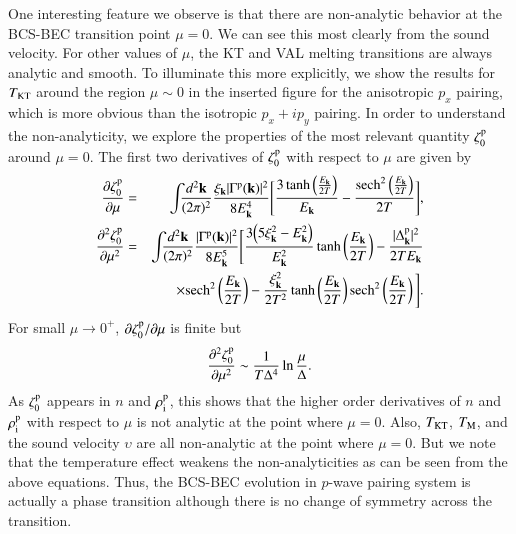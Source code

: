 \documentclass[aps,prd,amsmath,two column,nofootinbib,amssymb,referee]{revtex4}
\begin{document}
One interesting feature we observe is that there are non-analytic behavior at the BCS-BEC transition point $\mu=0$. We can see this most clearly from the sound velocity. For other values of $\mu$, the KT and VAL melting transitions are always analytic and smooth. To illuminate this more explicitly, we show the results for $T_{\rm KT}$ around the region $\mu\sim0$ in the inserted figure for the anisotropic $p_x$ pairing, which is more obvious than the isotropic $p_x+ip_y$ pairing. In order to understand the non-analyticity, we explore the properties of the most relevant quantity $\zeta_0^{\rm p}$ around $\mu=0$. The first two derivatives of $\zeta_0^{\rm p}$ with respect to $\mu$ are given by
\begin{eqnarray}
{\partial\zeta_0^{\rm p}\over\partial\mu}&=&\int\!\!\! {d^2{\bf k}\over(2\pi)^2}{\xi_{\bf k}|\Gamma^{\rm p}({\bf k})|^2\over8E_{\bf k}^4}\Bigg[{3\tanh\left({E_{\bf k}\over2T}\right)\over E_{\bf k}}-{{\rm sech}^2\left({E_{\bf k}\over2T}\right)\over2T}\Bigg],\\
{\partial^2\zeta_0^{\rm p}\over\partial\mu^2}&=&\int\!\!\! {d^2{\bf k}\over(2\pi)^2}\frac{|\Gamma^{\rm p}({\bf k})|^2}{8E_{\bf k}^5}\Bigg[{3\Big(5\xi_{\bf k}^2-E_{\bf k}^2\Big)\over E_{\bf k}^2}\tanh\left({E_{\bf k}\over2T}\right)-{|\Delta_{\bf k}^{\rm p}|^2\over2TE_{\bf k}}\nonumber\\
&&\!\!\!\!\times{\rm sech}^2\left({E_{\bf k}\over2T}\right)-{\xi_{\bf k}^2\over2T^2}\tanh\left({E_{\bf k}\over2T}\right){\rm sech}^2\left({E_{\bf k}\over2T}\right)\Bigg].\label{zetap2}
\end{eqnarray}
For small $\mu\rightarrow0^+$, $\partial\zeta_0^{\rm p}/\partial\mu$ is finite but 
\begin{eqnarray}
{\partial^2\zeta_0^{\rm p}\over\partial\mu^2}\sim {{1}\over{T\Delta^4}}\ln{{\mu}\over{\Delta}}.
\end{eqnarray}
As $\zeta_0^{\rm p}$ appears in $n$ and $\rho_{\rm i}^{\rm p}$, this shows that the higher order derivatives of $n$ and $\rho_{\rm i}^{\rm p}$ with respect to $\mu$ is not analytic at the point where $\mu=0$. Also, $T_{\rm KT}$, $T_{\rm M}$, and the sound velocity $\upsilon$ are all non-analytic at the point where $\mu=0$. But we note that the temperature effect weakens the non-analyticities as can be seen from the above equations. Thus, the BCS-BEC evolution in $p$-wave pairing system is actually a phase transition although there is no change of symmetry across the transition. 
\end{document}

